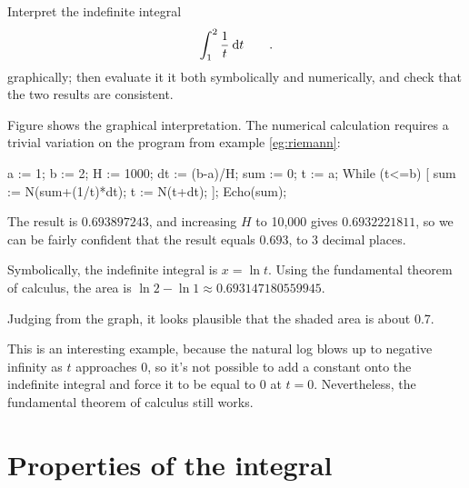 \begin{eg}\label{eg:hyperbola}
\egquestion Interpret the indefinite integral
\begin{equation*}
  \int_{1}^{2} \frac{1}{t}\:\textup{d} t \qquad .
\end{equation*}
graphically; then evaluate it it both symbolically and numerically, and check that the two results
are consistent.


\eganswer Figure  shows the graphical interpretation. The numerical calculation
requires a trivial variation on the program from example \ref{eg:riemann}:

\restartLineNumbers
\begin{Code}
  a := 1;
  b := 2;
  H := 1000;
  dt := (b-a)/H;
  sum := 0;
  t := a;
  While (t<=b) [
    sum := N(sum+(1/t)*dt);
    t := N(t+dt);
  ];
  Echo(sum);
\end{Code}
The result is $0.693897243$, and increasing $H$ to 10,000 gives $0.6932221811$, so we can be fairly confident that
the result equals $0.693$, to 3 decimal places.

Symbolically, the indefinite integral is $x=\ln t$. Using the fundamental theorem of calculus, the area
is $\ln 2-\ln 1\approx 0.693147180559945$.

Judging from the graph, it looks plausible that the shaded area is about 0.7.

This is an interesting example, because the natural log blows up to negative infinity as $t$ approaches 0,
so it's not possible to add a constant onto the indefinite integral and force it to be equal to
0 at $t=0$. Nevertheless, the fundamental theorem of calculus still works.

\end{eg}


\section{Properties of the integral}

